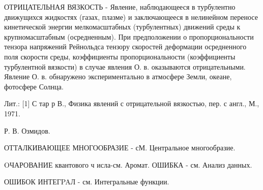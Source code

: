 \documentclass[10pt]{article}
\begin{document}
ОТРИЦАТЕЛЬНАЯ ВЯЗКОСТЬ - Явление, наблюдающееся в турбулентно движущихся жидкостях (газах, плазме) и заключающееся в нелинейном переносе кинетической энергии мелкомасштабных (турбулентных) движений среды к крупномасштабным (осредненным). При предположении о пропорциональности тензора напряжений Рейнольдса тензору скоростей деформации осредненного поля скорости среды, коэффициенты пропорциональности (коэффициенты турбулентной вязкости) в случае явления О. в. оказываются отрицательными. Явление О. в. обнаружено экспериментально в атмосфере Земли, океане, фотосфере Солнца.



Лит.: [1] С тар р В., Физика явлений с отрицательной вязкостью, пер. с англ., М., 1971.



Р. В. Озмидов.



ОТТАЛКИВАЮЩЕЕ МНОГООБРАЗИЕ - сМ. Центральное многообразие.



OЧАРОВАНИЕ квантового ч исла-см. Аромат. ОШИБКА - см. Анализ данных.



ОШИБОК ИНТЕГPAЛ - см. Интегральные функции.
\end{document}
